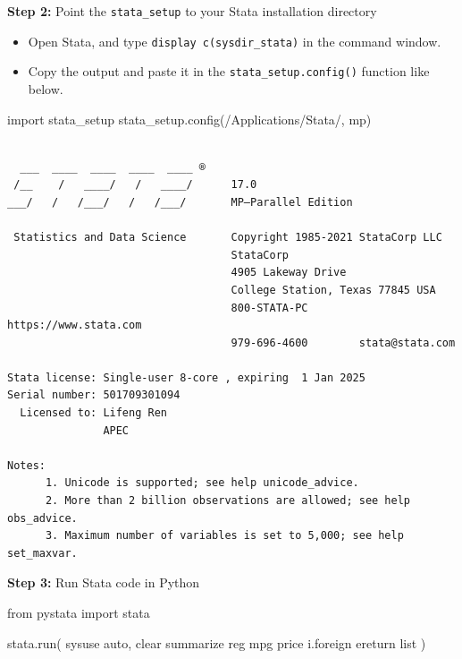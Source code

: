 \documentclass[
  letterpaper,
  DIV=11,
  numbers=noendperiod]{scrartcl}
\newenvironment{Shaded}{\begin{snugshade}}{\end{snugshade}}
\newcommand{\ImportTok}[1]{\textcolor[rgb]{0.00,0.46,0.62}{#1}}
\newcommand{\NormalTok}[1]{\textcolor[rgb]{0.00,0.23,0.31}{#1}}
\newcommand{\StringTok}[1]{\textcolor[rgb]{0.13,0.47,0.30}{#1}}
\providecommand{\tightlist}{%
  \setlength{\itemsep}{0pt}\setlength{\parskip}{0pt}}\usepackage{longtable,booktabs,array}
\begin{document}
\textbf{Step 2:} Point the \texttt{stata\_setup} to your Stata
installation directory

\begin{itemize}
\tightlist
\item
  Open Stata, and type \texttt{display\ c(sysdir\_stata)} in the command
  window.
\item
  Copy the output and paste it in the \texttt{stata\_setup.config()}
  function like below.
\end{itemize}

\begin{Shaded}
\begin{Highlighting}[numbers=left,,]
\ImportTok{import}\NormalTok{ stata\_setup}
\NormalTok{stata\_setup.config(}\StringTok{\textquotesingle{}/Applications/Stata/\textquotesingle{}}\NormalTok{, }\StringTok{\textquotesingle{}mp\textquotesingle{}}\NormalTok{)}
\end{Highlighting}
\end{Shaded}

\begin{verbatim}

  ___  ____  ____  ____  ____ ®
 /__    /   ____/   /   ____/      17.0
___/   /   /___/   /   /___/       MP—Parallel Edition

 Statistics and Data Science       Copyright 1985-2021 StataCorp LLC
                                   StataCorp
                                   4905 Lakeway Drive
                                   College Station, Texas 77845 USA
                                   800-STATA-PC        https://www.stata.com
                                   979-696-4600        stata@stata.com

Stata license: Single-user 8-core , expiring  1 Jan 2025
Serial number: 501709301094
  Licensed to: Lifeng Ren
               APEC

Notes:
      1. Unicode is supported; see help unicode_advice.
      2. More than 2 billion observations are allowed; see help obs_advice.
      3. Maximum number of variables is set to 5,000; see help set_maxvar.
\end{verbatim}

\textbf{Step 3:} Run Stata code in Python

\begin{Shaded}
\begin{Highlighting}[]
\ImportTok{from}\NormalTok{ pystata }\ImportTok{import}\NormalTok{ stata}

\NormalTok{stata.run(}\StringTok{\textquotesingle{}\textquotesingle{}\textquotesingle{}}
\StringTok{sysuse auto, clear}
\StringTok{summarize}
\StringTok{reg mpg price i.foreign}
\StringTok{ereturn list}
\StringTok{\textquotesingle{}\textquotesingle{}\textquotesingle{}}\NormalTok{)}
\end{Highlighting}
\end{Shaded}
\end{document}
